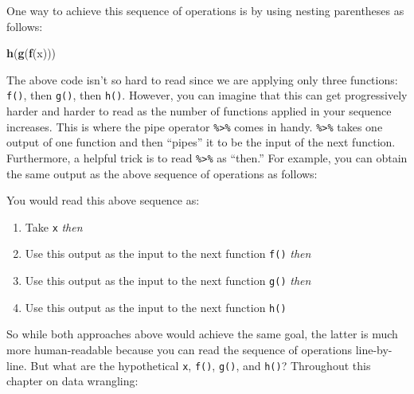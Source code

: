 \documentclass[12pt, krantz2,]{krantz}
\makeatletter
\newenvironment{Shaded}{\begin{snugshade}}{\end{snugshade}}
\newcommand{\KeywordTok}[1]{\textcolor[rgb]{0.27,0.27,0.27}{\textbf{#1}}}
\newcommand{\NormalTok}[1]{#1}
\newcommand{\OperatorTok}[1]{\textcolor[rgb]{0.43,0.43,0.43}{\textbf{#1}}}
\newcommand{\StringTok}[1]{\textcolor[rgb]{0.5,0.5,0.5}{#1}}
\providecommand{\tightlist}{%
  \setlength{\itemsep}{0pt}\setlength{\parskip}{0pt}}
\newenvironment{kframe}{%
\medskip{}
\setlength{\fboxsep}{.8em}
 \def\at@end@of@kframe{}%
 \ifinner\ifhmode%
  \def\at@end@of@kframe{\end{minipage}}%
  \begin{minipage}{\columnwidth}%
 \fi\fi%
 \def\FrameCommand##1{\hskip\@totalleftmargin \hskip-\fboxsep
 \colorbox{shadecolor}{##1}\hskip-\fboxsep
     \hskip-\linewidth \hskip-\@totalleftmargin \hskip\columnwidth}%
 \MakeFramed {\advance\hsize-\width
   \@totalleftmargin\z@ \linewidth\hsize
   \@setminipage}}%
 {\par\unskip\endMakeFramed%
 \at@end@of@kframe}
\renewenvironment{Shaded}{\begin{kframe}}{\end{kframe}}
\makeatother
\begin{document}
One way to achieve this sequence of operations is by using nesting parentheses as follows:

\begin{Shaded}
\begin{Highlighting}[]
\KeywordTok{h}\NormalTok{(}\KeywordTok{g}\NormalTok{(}\KeywordTok{f}\NormalTok{(x)))}
\end{Highlighting}
\end{Shaded}

The above code isn't so hard to read since we are applying only three functions: \texttt{f()}, then \texttt{g()}, then \texttt{h()}. However, you can imagine that this can get progressively harder and harder to read as the number of functions applied in your sequence increases. This is where the pipe operator \texttt{\%\textgreater{}\%} comes in handy. \texttt{\%\textgreater{}\%} takes one output of one function and then ``pipes'' it to be the input of the next function. Furthermore, a helpful trick is to read \texttt{\%\textgreater{}\%} as ``then.'' For example, you can obtain the same output as the above sequence of operations as follows:

\begin{Shaded}
\end{Shaded}

You would read this above sequence as:

\begin{enumerate}
\def\labelenumi{\arabic{enumi}.}
\tightlist
\item
  Take \texttt{x} \emph{then}
\item
  Use this output as the input to the next function \texttt{f()} \emph{then}
\item
  Use this output as the input to the next function \texttt{g()} \emph{then}
\item
  Use this output as the input to the next function \texttt{h()}
\end{enumerate}

So while both approaches above would achieve the same goal, the latter is much more human-readable because you can read the sequence of operations line-by-line. But what are the hypothetical \texttt{x}, \texttt{f()}, \texttt{g()}, and \texttt{h()}? Throughout this chapter on data wrangling:
\end{document}
